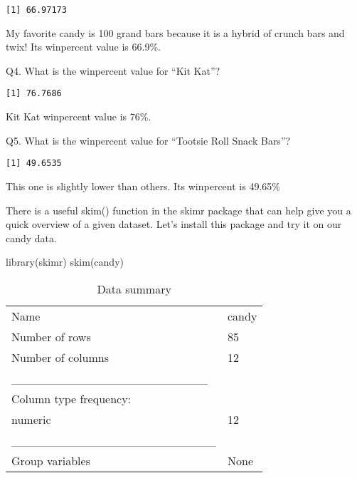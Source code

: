 \documentclass[
  letterpaper,
  DIV=11,
  numbers=noendperiod]{scrartcl}
\newenvironment{Shaded}{\begin{snugshade}}{\end{snugshade}}
\newcommand{\FunctionTok}[1]{\textcolor[rgb]{0.28,0.35,0.67}{#1}}
\newcommand{\NormalTok}[1]{\textcolor[rgb]{0.00,0.23,0.31}{#1}}
\newcommand{\SpecialCharTok}[1]{\textcolor[rgb]{0.37,0.37,0.37}{#1}}
\newcommand{\StringTok}[1]{\textcolor[rgb]{0.13,0.47,0.30}{#1}}
\begin{document}
\begin{verbatim}
[1] 66.97173
\end{verbatim}

My favorite candy is 100 grand bars because it is a hybrid of crunch
bars and twix! Its winpercent value is 66.9\%.

Q4. What is the winpercent value for ``Kit Kat''?

\begin{Shaded}
\end{Shaded}

\begin{verbatim}
[1] 76.7686
\end{verbatim}

Kit Kat winpercent value is 76\%.

Q5. What is the winpercent value for ``Tootsie Roll Snack Bars''?

\begin{Shaded}
\end{Shaded}

\begin{verbatim}
[1] 49.6535
\end{verbatim}

This one is slightly lower than others. Its winpercent is 49.65\%

There is a useful skim() function in the skimr package that can help
give you a quick overview of a given dataset. Let's install this package
and try it on our candy data.

\begin{Shaded}
\begin{Highlighting}[]
\FunctionTok{library}\NormalTok{(skimr)}
\FunctionTok{skim}\NormalTok{(candy)}
\end{Highlighting}
\end{Shaded}

\begin{longtable}[]{@{}ll@{}}
\caption{Data summary}\tabularnewline
\toprule()
\endhead
Name & candy \\
Number of rows & 85 \\
Number of columns & 12 \\
\_\_\_\_\_\_\_\_\_\_\_\_\_\_\_\_\_\_\_\_\_\_\_ & \\
Column type frequency: & \\
numeric & 12 \\
\_\_\_\_\_\_\_\_\_\_\_\_\_\_\_\_\_\_\_\_\_\_\_\_ & \\
Group variables & None \\
\bottomrule()
\end{longtable}
\end{document}

